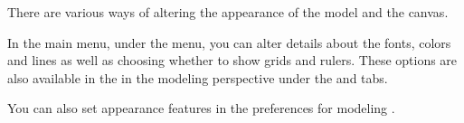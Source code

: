 
There are various ways of altering the appearance of the model and the canvas. 

In the main menu, under the  menu, you can alter details about the fonts, colors and lines as well as choosing whether to show grids and rulers. These options are also available in the \gdpropview{} in the modeling perspective under the  and  tabs. 

You can also set appearance features in the preferences for modeling . 
